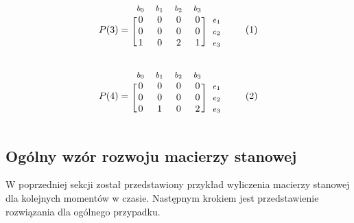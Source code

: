 \documentclass[12pt]{book}
\newcommand\addtag{\refstepcounter{equation}
\tag{\theequation}}
\begin{document}
\begin{equation*}
  P(3)=
  \begin{blockarray}{*{4}{c} l}
    \begin{block}{*{4}{>{$\footnotesize}c<{$}} l}
      $b_0$ & $b_1$ & $b_2$ & $b_3$ \\
    \end{block}
    \begin{block}{[*{4}{c}]>{$\footnotesize}l<{$}}
       0 & 0 & 0 & 0 & $e_1$ \\
       0 & 0 & 0 & 0 & $e_2$ \\
       1 & 0 & 2 & 1 & $e_3$ \\
    \end{block}
  \end{blockarray} \addtag
\end{equation*}

\begin{equation*}
  P(4)=
  \begin{blockarray}{*{4}{c} l}
    \begin{block}{*{4}{>{$\footnotesize}c<{$}} l}
     $b_0$ & $b_1$ & $b_2$ & $b_3$ \\
    \end{block}
    \begin{block}{[*{4}{c}]>{$\footnotesize}l<{$}}
       0 & 0 & 0 & 0 & $e_1$ \\
       0 & 0 & 0 & 0 & $e_2$ \\
       0 & 1 & 0 & 2 & $e_3$ \\
    \end{block}
  \end{blockarray} \addtag
\end{equation*}

\subsection{Ogólny wzór rozwoju macierzy stanowej}
W poprzedniej sekcji został przedstawiony przykład wyliczenia macierzy stanowej dla kolejnych momentów w czasie. Następnym krokiem jest przedstawienie rozwiązania dla ogólnego przypadku. \\ 
\end{document}
